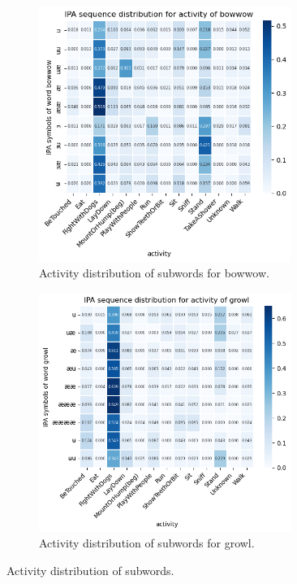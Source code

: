 \documentclass[letterpaper]{article}
\begin{document}
\begin{figure}[h]
\begin{subfigure}[]{0.4\textwidth}
	\centering
	\includegraphics[width=0.9\textwidth]{images/ipa_bowwow.png}
	\caption{Activity distribution of subwords for bowwow.}
\label{fig:5}
\end{subfigure}
\begin{subfigure}[]{0.4\textwidth}
	\centering
	\includegraphics[width=0.9\textwidth]{images/ipa_growl.png}
	\caption{Activity distribution of subwords for growl.}
	\label{fig:6}
\end{subfigure}

\caption{Activity distribution of subwords.}
\label{fig:activity_subwords}
\end{figure}
\end{document}
